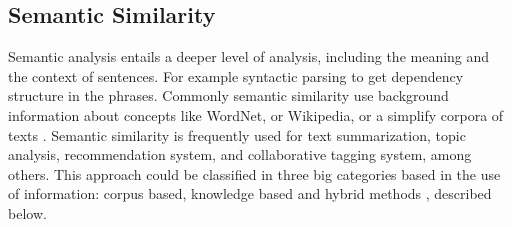 \documentclass[12pt]{report}
\begin{document}
\subsection{Semantic Similarity} \label{sem_sim}
Semantic analysis entails a deeper level of analysis, including the meaning and the context of sentences. For example syntactic parsing to get dependency structure in the phrases. Commonly semantic similarity use background information about concepts like WordNet, or Wikipedia,  or a simplify corpora of texts  \cite{Ganesan2015,Zhang2015}.
Semantic similarity is frequently used for text summarization, topic analysis, recommendation system, and collaborative tagging system, among others. This approach could be classified in three big categories based in the use of information: corpus based,  knowledge based and hybrid methods \cite{Gomaa2013, Zhang2015}, described below.
\end{document}
